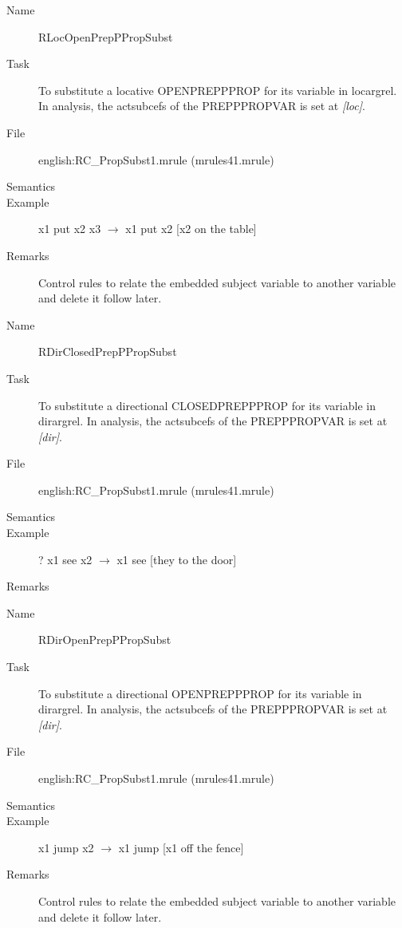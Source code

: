 \begin{description}
\vspace{1 cm}
\begin{description}
\item[Name] RLocOpenPrepPPropSubst
\item[Task] To substitute a locative OPENPREPPPROP for its variable in 
locargrel. In analysis, the actsubcefs of the PREPPPROPVAR is set at 
{\em [loc]\/}. 
\item[File] english:RC\_PropSubst1.mrule (mrules41.mrule)
\item[Semantics]
\item[Example] x1 put x2 x3 $\rightarrow$ x1 put x2 [x2 on the table]
\item[Remarks] Control rules to relate the embedded subject variable to 
another variable and delete it follow later.
\end{description}

\vspace{1 cm}
\begin{description}
\item[Name]   RDirClosedPrepPPropSubst
\item[Task] To substitute a directional CLOSEDPREPPPROP for its variable in 
dirargrel. In analysis, the actsubcefs of the PREPPPROPVAR is set at 
{\em [dir]\/}.
\item[File] english:RC\_PropSubst1.mrule (mrules41.mrule)
\item[Semantics]
\item[Example] ? x1 see x2 $\rightarrow$ x1 see [they to the door]
\item[Remarks]
\end{description}

\vspace{1 cm}
\begin{description}
\item[Name] RDirOpenPrepPPropSubst
\item[Task] To substitute a directional OPENPREPPPROP for its variable in 
dirargrel. In analysis, the actsubcefs of the PREPPPROPVAR is set at 
{\em [dir]\/}. 
\item[File] english:RC\_PropSubst1.mrule (mrules41.mrule)
\item[Semantics]
\item[Example] x1 jump x2 $\rightarrow$ x1 jump [x1 off the fence]
\item[Remarks] Control rules to relate the embedded subject variable to 
another variable and delete it follow later.
\end{description}


\end{description}
